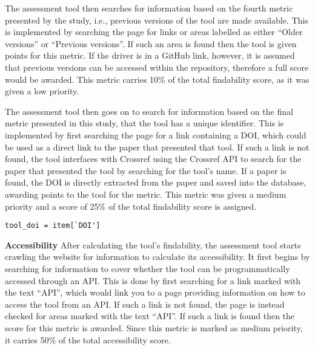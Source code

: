 \documentclass{cisfyp}
\begin{document}
The assessment tool then searches for information based on the fourth metric presented by the study, i.e., previous versions of the tool are made available. This is implemented by searching the page for links or areas labelled as either ``Older versions'' or ``Previous versions''. If such an area is found then the tool is given points for this metric. If the driver is in a GitHub link, however, it is assumed that previous versions can be accessed within the repository, therefore a full score would be awarded. This metric carries 10\% of the total findability score, as it was given a low priority.

The assessment tool then goes on to search for information based on the final metric presented in this study, that the tool has a unique identifier. This is implemented by first searching the page for a link containing a DOI, which could be used as a direct link to the paper that presented that tool. If such a link is not found, the tool interfaces with Crossref using the Crossref API to search for the paper that presented the tool by searching for the tool's name. If a paper is found, the DOI is directly extracted from the paper and saved into the database, awarding points to the tool for the metric. This metric was given a medium priority and a score of 25\% of the total findability score is assigned.
\begin{lstlisting}[frame = single, caption={Extracting DOI from paper.}, captionpos=b]
tool_doi = item[`DOI']
\end{lstlisting}
\textbf{Accessibility}\newline
After calculating the tool's findability, the assessment tool starts crawling the website for information to calculate its accessibility. It first begins by searching for information to cover whether the tool can be programmatically accessed through an API. This is done by first searching for a link marked with the text ``API'', which would link you to a page providing information on how to access the tool from an API. If such a link is not found, the page is instead checked for areas marked with the text ``API''. If such a link is found then the score for this metric is awarded. Since this metric is marked as medium priority, it carries 50\% of the total accessibility score.
\end{document}
